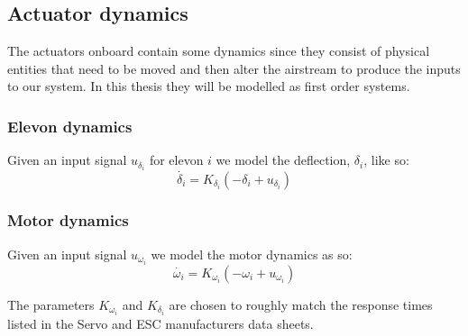 \subsection{Actuator dynamics}
The actuators onboard contain some dynamics since they consist of physical entities that need to be moved and then alter the airstream to produce the inputs to our system.
In this thesis they will be modelled as first order systems.
\subsubsection{Elevon dynamics}
Given an input signal $u_{\delta_i}$ for elevon $i$ we model the deflection, $\delta_i$, like so:
\begin{equation}
    \dot{\delta_i} = K_{\delta_i} (-\delta_i + u_{\delta_i})
\end{equation}

\subsubsection{Motor dynamics}
Given an input signal $u_{\omega_i}$ we model the motor dynamics as so:
\begin{equation}
    \dot{\omega_i} =  K_{\omega_i}(-\omega_i + u_{\omega_i})
\end{equation}

The parameters $K_{\omega_i}$ and $K_{\delta_i}$ are chosen to roughly match the response times listed in the Servo and ESC manufacturers data sheets.